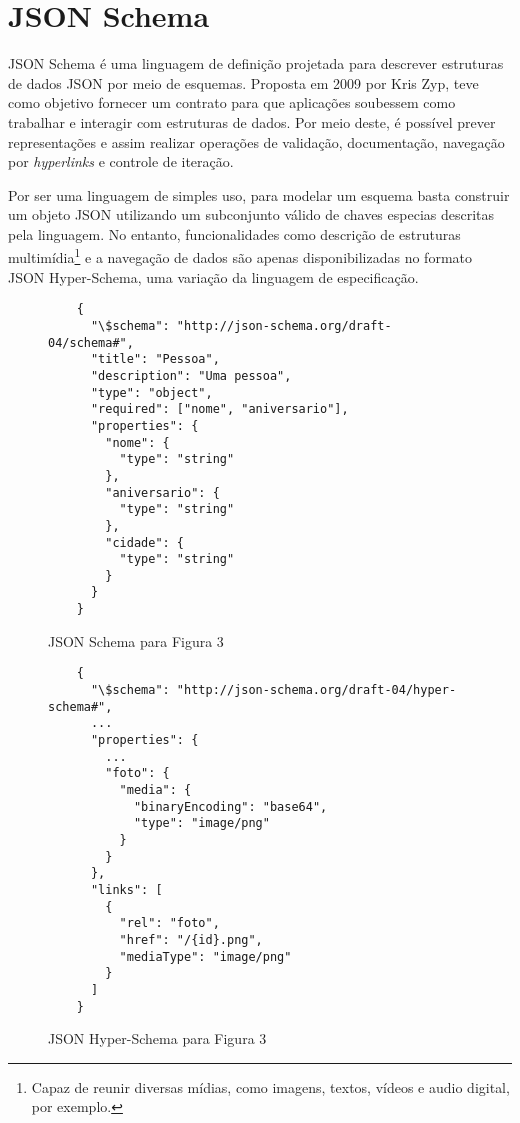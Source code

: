 \section[JSON Schema]{JSON Schema}

JSON Schema é uma linguagem de definição projetada para descrever estruturas de dados JSON por meio de esquemas. Proposta em 2009 por Kris Zyp, teve como objetivo fornecer um contrato para que aplicações soubessem como trabalhar e interagir com estruturas de dados. Por meio deste, é possível prever representações e assim realizar operações de validação, documentação, navegação por \textit{hyperlinks} e controle de iteração.

Por ser uma linguagem de simples uso, para modelar um esquema basta construir um objeto JSON utilizando um subconjunto válido de chaves especias descritas pela linguagem. No entanto, funcionalidades como descrição de estruturas multimídia\footnote{
 Capaz de reunir diversas mídias, como imagens, textos, vídeos e audio digital, por exemplo.
} e a navegação de dados são apenas disponibilizadas no formato JSON Hyper-Schema, uma variação da linguagem de especificação. \cite{Jackson2016}

\begin{figure}[H]
  \centering
  \begin{verbatim}
    {
      "\$schema": "http://json-schema.org/draft-04/schema#",
      "title": "Pessoa",
      "description": "Uma pessoa",
      "type": "object",
      "required": ["nome", "aniversario"],
      "properties": {
        "nome": {
          "type": "string"
        },
        "aniversario": {
          "type": "string"
        },
        "cidade": {
          "type": "string"
        }
      }
    }
  \end{verbatim}
  \caption{JSON Schema para Figura 3}
\end{figure}

\begin{figure}[H]
  \centering
  \begin{verbatim}
    {
      "\$schema": "http://json-schema.org/draft-04/hyper-schema#",
      ...
      "properties": {
        ...
        "foto": {
          "media": {
            "binaryEncoding": "base64",
            "type": "image/png"
          }
        }
      },
      "links": [
        {
          "rel": "foto",
          "href": "/{id}.png",
          "mediaType": "image/png"
        }
      ]
    }
  \end{verbatim}
  \caption{JSON Hyper-Schema para Figura 3}
\end{figure}


